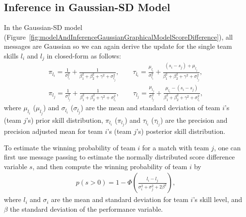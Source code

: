 \documentclass[runningheads,a4paper]{llncs}
\begin{document}
\subsection{Inference in Gaussian-SD Model}

 In the Gaussian-SD model
(Figure~\ref{fig:modelAndInferenceGaussianGraphicalModelScoreDifference}),
all messages are Gaussian so we can again derive the update
for the single team skills $l_i$ and $l_j$ in closed-form
as follows:
{\small
\begin{align}
  \pi_{l_{i}}  =  \frac{1}{\sigma_{l_{i}}^2} + \frac{1}{\beta_1^2+\beta_2^2+\gamma^2+\sigma_{l_{j}}^2}, \qquad  \tau_{l_{i}} =    \frac{\mu_{l_{i}}}{\sigma_{l_{i}}^2} + \frac{(s_i-s_j)+\mu_{l_{j}}}{\beta_1^2+\beta_2^2+\gamma^2+\sigma_{l_{j}}^2},                                      \\
  \pi_{l_{j}}  =    \frac{1}{\sigma_{l_{j}}^2} + \frac{1}{\beta_1^2+\beta_2^2+\gamma^2+\sigma_{l_{i}}^2}, \qquad \tau_{l_{j}} =    \frac{\mu_{l_{j}}}{\sigma_{l_{j}}^2} + \frac{\mu_{l_{i}}-(s_i-s_j)}{\beta_1^2+\beta_2^2+\gamma^2+\sigma_{l_{i}}^2},
  \end{align}}
where $\mu_{l_i}$ ($\mu_{l_j}$) and $\sigma_{l_i}$
      ($\sigma_{l_j}$) are the mean and standard deviation of team
      $i$'s (team $j$'s) prior skill distribution,
$\pi_{l_{i}}$ ($\pi_{l_{j}}$) and $\tau_{l_{i}}$
      ($\tau_{l_{j}}$) are the precision and precision adjusted mean
      for team $i$'s (team $j$'s) posterior skill distribution.

 To estimate the winning probability of team $i$ for a match with team $j$, one can first use message passing to estimate the normally distributed score difference variable $s$, and then compute the winning probability of team $i$ by
{\small
\begin{align}
  p(s>0) = 1 -
  \Phi\left(\frac{l_i-l_j}{\sigma_i^2+\sigma_j^2+2 \beta^2}\right),
\end{align}}
where $l_i$ and $\sigma_i$ are the mean and standard deviation for
team $i$'s skill level, and $\beta$ the standard deviation of the
performance variable.
\end{document}

